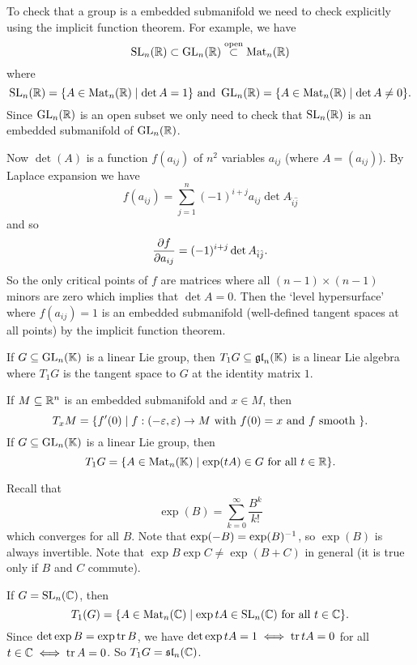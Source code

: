 \begin{exam}
  To check that a group is a embedded submanifold we need to check explicitly using the implicit function theorem.
  For example, we have
  \[ \operatorname{SL}_n(\mathbb{R}) \subset \operatorname{GL}_n(\mathbb{R}) \overset{\text{open}}{\subset} \operatorname{Mat}_n(\mathbb{R}) \]
  where
  \[ \operatorname{SL}_n(\mathbb{R}) = \{ A \in \operatorname{Mat}_n(\mathbb{R}) \mid \det A = 1 \} \text{ and } \operatorname{GL}_n(\mathbb{R}) = \{ A \in \operatorname{Mat}_n(\mathbb{R}) \mid \det A \neq 0 \}. \]
  Since $\operatorname{GL}_n(\mathbb{R})$ is an open subset we only need to check that $\operatorname{SL}_n(\mathbb{R})$ is an embedded submanifold of $\operatorname{GL}_n(\mathbb{R})$.

  Now $\det(A)$ is a function $f(a_{ij})$ of $n^2$ variables $a_{ij}$ (where $A=(a_{ij})$).
  By Laplace expansion we have
  \[ f(a_{ij}) = \sum_{j=1}^n (-1)^{i+j} a_{ij} \det A_{\hat i \hat j} \]
  and so
  \[ \frac{\partial f}{\partial a_{ij}} = (-1)^{i+j} \det A_{\hat i \hat j}. \]
  So the only critical points of $f$ are matrices where all $(n-1) \times (n-1)$ minors are zero which implies that $\det A=0$.
  Then the `level hypersurface' where $f(a_{ij})=1$ is an embedded submanifold (well-defined tangent spaces at all points) by the implicit function theorem.
\end{exam}

\begin{prop}
  If $G \subseteq \operatorname{GL}_n(\mathbb{K})$ is a linear Lie group, then $T_1G \subseteq \operatorname{\mathfrak{gl}}_n(\mathbb{K})$ is a linear Lie algebra where $T_1G$ is the tangent space to $G$ at the identity matrix $1$.
\end{prop}

\begin{defn}
  If $M \subseteq \mathbb{R}^n$ is an embedded submanifold and $x \in M$, then
  \[ T_xM = \{ f'(0) \mid f: (-\varepsilon,\varepsilon) \to M \text{ with } f(0)=x \text{ and } f \text{ smooth } \}. \]
  If $G \subseteq \operatorname{GL}_n(\mathbb{K})$ is a linear Lie group, then
  \[ T_1G = \{ A \in \operatorname{Mat}_n(\mathbb{K}) \mid \exp(tA) \in G \text{ for all } t \in \mathbb{R} \}. \]
\end{defn}

\begin{rmk}
  Recall that
  \[ \exp(B) = \sum_{k=0}^\infty \frac{B^k}{k!} \]
  which converges for all $B$.
  Note that $\exp(-B)=\exp(B)^{-1}$, so $\exp(B)$ is always invertible.
  Note that $\exp B \exp C \neq \exp(B+C)$ in general (it is true only if $B$ and $C$ commute).
\end{rmk}

\begin{exam}
  If $G=\operatorname{SL}_n(\mathbb{C})$, then
  \[ T_1(G) = \{ A \in \operatorname{Mat}_n(\mathbb{C}) \mid \exp tA \in \operatorname{SL}_n(\mathbb{C}) \text{ for all } t \in \mathbb{C} \}. \]
  Since $\det\exp B = \exp\operatorname{tr} B$, we have $\det\exp tA = 1 \iff \operatorname{tr} tA = 0$ for all $t \in \mathbb{C} \iff \operatorname{tr} A=0$.
  So $T_1G = \operatorname{\mathfrak{sl}}_n(\mathbb{C})$.
\end{exam}

